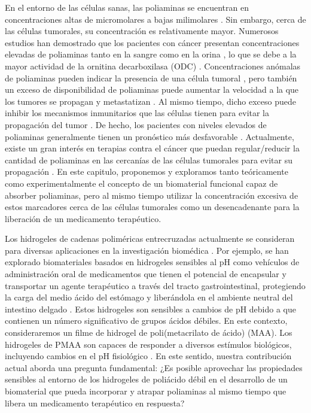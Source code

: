 En el entorno de las c\'elulas sanas, las poliaminas se encuentran en concentraciones altas de micromolares a bajas milimolares .
Sin embargo, cerca de las c\'elulas tumorales, su concentraci\'on es relativamente mayor.
Numerosos estudios han demostrado que los pacientes con c\'ancer presentan concentraciones elevadas de poliaminas tanto en la sangre como en la orina \addcite[Russell1971], lo que se debe a la mayor actividad de la ornitina decarboxilasa (ODC) .
Concentraciones an\'omalas de poliaminas pueden indicar la presencia de una c\'elula tumoral , pero tambi\'en un exceso de disponibilidad de poliaminas puede aumentar la velocidad a la que los tumores se propagan y metastatizan \addcite[Soda2011].
Al mismo tiempo, dicho exceso puede inhibir los mecanismos inmunitarios que las c\'elulas tienen para evitar la propagaci\'on del tumor .
De hecho, los pacientes con niveles elevados de poliaminas generalmente tienen un pron\'ostico m\'as desfavorable .
Actualmente, existe un gran inter\'es en terapias contra el c\'ancer que puedan regular/reducir la cantidad de poliaminas en las cercan\'ias de las c\'elulas tumorales para evitar su propagaci\'on .
En este capitulo, proponemos y exploramos tanto te\'oricamente como experimentalmente el concepto de un biomaterial funcional capaz de absorber poliaminas, pero al mismo tiempo utilizar la concentraci\'on excesiva de estos marcadores cerca de las c\'elulas tumorales como un desencadenante para la liberaci\'on de un medicamento terap\'eutico.

Los hidrogeles de cadenas polim\'ericas entrecruzadas actualmente se consideran para diversas aplicaciones en la investigaci\'on biom\'edica \addcite[Wang2019].
Por ejemplo, se han explorado biomateriales basados en hidrogeles sensibles al pH como veh\'iculos de administraci\'on oral de medicamentos que tienen el potencial de encapsular y transportar un agente terap\'eutico a trav\'es del tracto gastrointestinal, protegiendo la carga del medio \'acido del est\'omago y liber\'andola en el ambiente neutral del intestino delgado .
Estos hidrogeles son sensibles a cambios de pH debido a que contienen un n\'umero significativo de grupos \'acidos d\'ebiles.
En este contexto, consideraremos un filme de hidrogel de poli(metacrilato de \'acido) (MAA).
Los hidrogeles de PMAA son capaces de responder a diversos est\'imulos biol\'ogicos, incluyendo cambios en el pH fisiol\'ogico .
En este sentido, nuestra contribuci\'on actual aborda una pregunta fundamental: ¿Es posible aprovechar las propiedades sensibles al entorno de los hidrogeles de poli\'acido d\'ebil en el desarrollo de un biomaterial que pueda incorporar y atrapar poliaminas al mismo tiempo que libera un medicamento terap\'eutico en respuesta?

